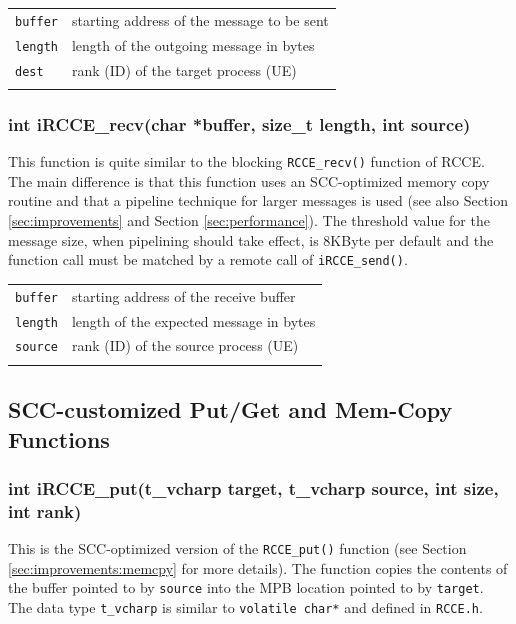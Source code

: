 \documentclass[fontsize=10pt, paper=a4, DIV12, pagesize=auto]{scrartcl}
\begin{document}
\begin{tabular}{ll}
\texttt{buffer}  & starting address of the message to be sent \\
\texttt{length}  & length of the outgoing message in bytes \\
\texttt{dest}    & rank (ID) of the target process (UE) \\
\hspace{2.0cm}
\end{tabular}


\subsubsection{int iRCCE\_recv(char *buffer, size\_t length, int source)}\vspace{-0.3cm}
This function is quite similar to the blocking \texttt{RCCE\_recv()} function of RCCE.
The main difference is that this function uses an SCC-optimized memory copy routine and that a pipeline technique for larger messages is used (see also Section \ref{sec:improvements} and Section \ref{sec:performance}).
The threshold value for the message size, when pipelining should take effect, is 8KByte per default and the function call must be matched by a remote call of \texttt{iRCCE\_send()}.

\begin{tabular}{ll}
\texttt{buffer}  & starting address of the receive buffer \\
\texttt{length}  & length of the expected message in bytes \\
\texttt{source}  & rank (ID) of the source process (UE) \\
\hspace{2.0cm}
\end{tabular}


\subsection{SCC-customized Put/Get and Mem-Copy Functions}

\subsubsection{int iRCCE\_put(t\_vcharp target, t\_vcharp source, int size, int rank)}\vspace{-0.3cm}
This is the SCC-optimized version of the \texttt{RCCE\_put()} function (see Section \ref{sec:improvements:memcpy} for more details).
The function copies the contents of the buffer pointed to by \texttt{source} into the MPB location pointed to by \texttt{target}.
The data type \texttt{t\_vcharp} is similar to \texttt{volatile char*} and defined in \texttt{RCCE.h}.
\end{document}
